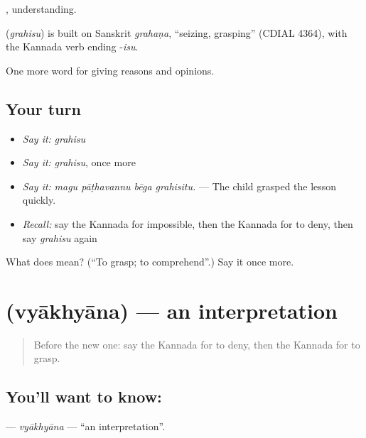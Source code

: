 , understanding.

\begin{cousinweb}
\textbf{} (\emph{grahisu}) is built on Sanskrit \emph{grahaṇa}, \textquotedblleft{}seizing, grasping\textquotedblright{} (CDIAL 4364), with the Kannada verb ending -\emph{isu}.
\end{cousinweb}

\begin{grammarlens}[title={What you've built}]
One more word for giving reasons and opinions.
\end{grammarlens}

\subsection*{Your turn}
\begin{itemize}
\raggedright
  \item \emph{Say it:} \emph{grahisu}
  \item \emph{Say it:} \emph{grahisu}, once more
  \item \emph{Say it:} \emph{magu pāṭhavannu bēga grahisitu.} — The child grasped the lesson quickly.
  \item \emph{Recall:} say the Kannada for impossible, then the Kannada for to deny, then say \emph{grahisu} again
\end{itemize}

\begin{tcolorbox}[breakable,colback=teal!4,colframe=teal!35!black,title={Before you move on}]
What does  mean? (\textquotedblleft{}To grasp; to comprehend\textquotedblright{}.) Say it once more.
\end{tcolorbox}
\section[\texorpdfstring{\kn{ವ್ಯಾಖ್ಯಾನ} (vyākhyāna)}{ವ್ಯಾಖ್ಯಾನ (vyākhyāna)}]{ (vyākhyāna) — an interpretation}

\label{lesson:KA-C384-vyakhyana}



\begin{quote}
Before the new one: say the Kannada for to deny, then the Kannada for to grasp.
\end{quote}

\subsection*{You'll want to know: }
\textbf{} — \emph{vyākhyāna} — \textquotedblleft{}an interpretation\textquotedblright{}.

